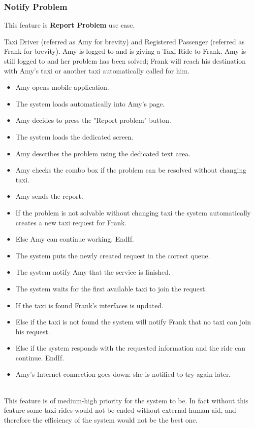 \subsubsection{Notify Problem}
This feature is \textbf{Report Problem} use case.
\begin{itemize}
	 Taxi Driver (referred as Amy for brevity) and Registered Passenger (referred as Frank for brevity).
	 Amy is logged to \myTaxiService{} and is giving a Taxi Ride to Frank.
	 Amy is still logged to \myTaxiService{} and her problem has been solved; Frank will reach his destination with Amy's taxi or another taxi automatically called for him.
	\begin{itemize}
		\item Amy opens \myTaxiService{} mobile application.
		\item The system loads automatically into Amy's page.
		\item Amy decides to press the "Report problem" button.
		\item The system loads the dedicated screen.
		\item Amy describes the problem using the dedicated text area.
		\item Amy checks the combo box if the problem can be resolved without changing taxi.
		\item Amy sends the report.
		\item If the problem is not solvable without changing taxi the system automatically creates a new taxi request for Frank.
		\item Else Amy can continue working. EndIf.
		\item The system puts the newly created request in the correct queue.
		\item The system notify Amy that the service is finished.
		\item The system waits for the first available taxi to join the request.
		\item If the taxi is found Frank's interfaces is updated.
		\item Else if the taxi is not found the system will notify Frank that no taxi can join his request.
		\item Else if the system responds with the requested information and the ride can continue. EndIf.
	\end{itemize}
	\begin{itemize}
		\item Amy's Internet connection goes down: she is notified to try again later.
	\end{itemize}
\end{itemize}
\\
This feature is of medium-high priority for the system to be. In fact without this feature some taxi rides would not be ended without external human aid, and therefore the efficiency of the system would not be the best one.

